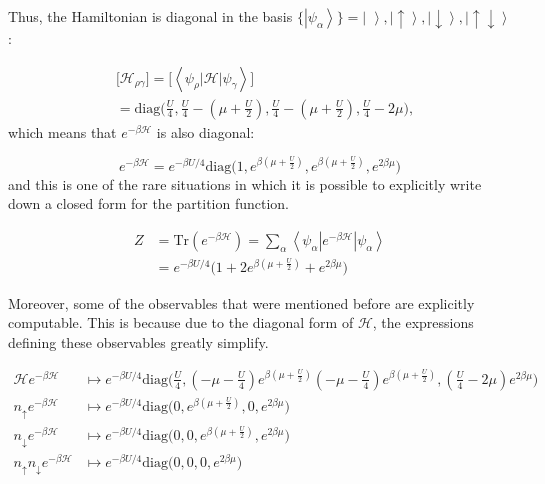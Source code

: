 Thus, the Hamiltonian is diagonal in the basis $\{\left| \psi_\alpha \right\rangle \} = \left| \,\, \right\rangle, \left|\uparrow \right\rangle, \left|\downarrow\right \rangle, \left|\uparrow \downarrow \right\rangle $:

\begin{equation}
\begin{split}
&\bigg[ \mathcal{H}_{\rho\gamma} \bigg] = \bigg[ \left\langle \psi_\rho \left| \mathcal{H} \right| \psi_\gamma \right\rangle \bigg] \\
&= \text{diag}\bigg(\frac{U}{4}, \frac{U}{4} - (\mu + \frac{U}{2} ), \frac{U}{4} - (\mu + \frac{U}{2} ), \frac{U}{4} - 2 \mu \bigg) ,
\end{split}
\end{equation}
which means that $e^{-\beta \mathcal{H} }$ is also diagonal:

\begin{equation}
e^{-\beta \mathcal{H} } = e^{-\beta U / 4}  \text{diag}\bigg(1,  e^{\beta(\mu + \frac{U}{2})}, e^{\beta(\mu + \frac{U}{2})},  e^{2\beta \mu} \bigg)
\end{equation}
and this is one of the rare situations in which it is possible to explicitly write down a closed form for the partition function.

\begin{equation}
\begin{split}
Z &= \text{Tr} ( e^{-\beta\mathcal{H} } ) = \sum_\alpha \left\langle \psi_\alpha \left|e^{-\beta \mathcal{H} } \right| \psi_\alpha \right\rangle \\
&= e^{-\beta U / 4} \bigg(1 + 2 e^{\beta(\mu + \frac{U}{2})} + e^{2 \beta \mu} \bigg)
\end{split}
\end{equation}

Moreover, some of the observables that were mentioned before are explicitly computable. This is because due to the diagonal form of $\mathcal{H}$, the expressions defining these observables greatly simplify.

\begin{equation}
\begin{split}
\mathcal{H} e^{-\beta\mathcal{H} } &\mapsto e^{-\beta U / 4}  \text{diag}\bigg(\frac{U}{4}, (-\mu - \frac{U}{4})  e^{\beta(\mu + \frac{U}{2})} (-\mu - \frac{U}{4}) e^{\beta(\mu + \frac{U}{2})}, (\frac{U}{4} - 2\mu ) e^{2\beta \mu} \bigg) \\
n_{\uparrow} e^{-\beta\mathcal{H} } &\mapsto e^{-\beta U / 4}  \text{diag}\bigg(0, e^{\beta(\mu + \frac{U}{2})}, 0,  e^{2\beta \mu} \bigg) \\
n_{\downarrow} e^{-\beta\mathcal{H} } &\mapsto e^{-\beta U / 4}  \text{diag}\bigg(0, 0, e^{\beta(\mu + \frac{U}{2})},   e^{2\beta \mu} \bigg) \\
n_{\uparrow} n_{\downarrow} e^{-\beta\mathcal{H} } &\mapsto e^{-\beta U / 4}  \text{diag}\bigg(0, 0, 0,   e^{2\beta \mu} \bigg) \\
\end{split}
\end{equation}

